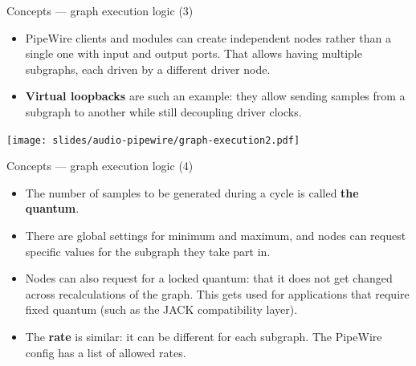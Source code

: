 \begin{frame}{Concepts — graph execution logic (3)}
  \begin{itemize}

  \item PipeWire clients and modules can create independent nodes
    rather than a single one with input and output ports. That allows
    having multiple subgraphs, each driven by a different driver node.

  \item \textbf{Virtual loopbacks} are such an example: they allow
    sending samples from a subgraph to another while still decoupling
    driver clocks.

  \end{itemize}

  \begin{center}
    \texttt{[image: slides/audio-pipewire/graph-execution2.pdf]}\\
  \end{center}
\end{frame}



\begin{frame}{Concepts — graph execution logic (4)}
  \begin{itemize}

  \item The number of samples to be generated during a cycle is called
    \textbf{the quantum}.

  \item There are global settings for minimum and
    maximum, and nodes can request specific values for the subgraph
    they take part in.

  \item Nodes can also request for a locked quantum: that it does not
    get changed across recalculations of the graph. This gets used for
    applications that require fixed quantum (such as the JACK
    compatibility layer).

  \item The \textbf{rate} is similar: it can be different for each
    subgraph. The PipeWire config has a list of allowed rates.

  \end{itemize}
\end{frame}



